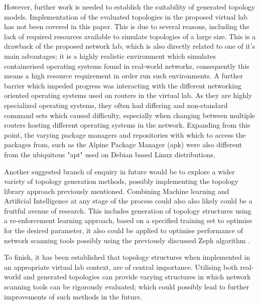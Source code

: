  However, further work is needed to establish the suitability of generated topology models. Implementation of the evaluated topologies in the proposed virtual lab has not been covered in this paper. This is due to several reasons, including the lack of required resources available to simulate topologies of a large size. This is a drawback of the proposed network lab, which is also directly related to one of it's main advantages; it is a highly realistic environment which simulates containerised operating systems found in real-world networks, consequently this means a high resource requirement in order run such environments. A further barrier which impeded progress was interacting with the different networking oriented operating systems used on routers in the virtual lab. As they are highly specialized operating systems, they often had differing and non-standard command sets which caused difficulty, especially when changing between multiple routers hosting different operating systems in the network. Expanding from this point, the varying package managers and repositories with which to access the packages from, such as the Alpine Package Manager (apk)\cite{alpine} were also different from the ubiquitous "apt" used on Debian based Linux distributions. 

 Another suggested branch of enquiry in future would be to explore a wider variety of topology generation methods, possibly implementing the topology library approach previously mentioned. Combining Machine learning and Artificial Intelligence at any stage of the process could also also likely could be a fruitful avenue of research. This includes generation of topology structures using a re-enforcement learning approach, based on a specified training set to optimise for the desired parameter, it also could be applied to optimise performance of network scanning tools possibly using the previously discussed Zeph algorithm \cite{zephMap}. 

 To finish, it has been established that topology structures when implemented in an appropriate virtual lab context, are of central importance. Utilising both real-world and generated topologies can provide varying structures in which network scanning tools can be rigorously evaluated; which could possibly lead to further improvements of such methods in the future. 